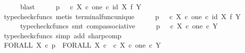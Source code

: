\begin{isabellebody}
\ \ \ \ \isamarkupfalse%
\ blast\isanewline
\ \ \isamarkupfalse%
\ \isamarkupfalse%
\ {\isachardoublequoteopen}p\isactrlsup {\isasymsharp}\ {\isacharequal}{\kern0pt}\ {\isacharparenleft}{\kern0pt}{\isasymt}\ {\isasymcirc}\isactrlsub c\ {\isasymbeta}\isactrlbsub X\ {\isasymtimes}\isactrlsub c\ one\isactrlesub \ {\isasymcirc}\isactrlsub c\ {\isacharparenleft}{\kern0pt}id\ X\ {\isasymtimes}\isactrlsub f\ {\isasymbeta}\isactrlbsub Y\isactrlesub {\isacharparenright}{\kern0pt}{\isacharparenright}{\kern0pt}\isactrlsup {\isasymsharp}{\isachardoublequoteclose}\isanewline
\ \ \ \ \isamarkupfalse%
\ {\isacharparenleft}{\kern0pt}typecheck{\isacharunderscore}{\kern0pt}cfuncs{\isacharcomma}{\kern0pt}\ metis\ terminal{\isacharunderscore}{\kern0pt}func{\isacharunderscore}{\kern0pt}unique{\isacharparenright}{\kern0pt}\isanewline
\ \ \isamarkupfalse%
\ \isamarkupfalse%
\ {\isachardoublequoteopen}p\isactrlsup {\isasymsharp}\ {\isacharequal}{\kern0pt}\ {\isacharparenleft}{\kern0pt}{\isacharparenleft}{\kern0pt}{\isasymt}\ {\isasymcirc}\isactrlsub c\ {\isasymbeta}\isactrlbsub X\ {\isasymtimes}\isactrlsub c\ one\isactrlesub {\isacharparenright}{\kern0pt}\ {\isasymcirc}\isactrlsub c\ {\isacharparenleft}{\kern0pt}id\ X\ {\isasymtimes}\isactrlsub f\ {\isasymbeta}\isactrlbsub Y\isactrlesub {\isacharparenright}{\kern0pt}{\isacharparenright}{\kern0pt}\isactrlsup {\isasymsharp}{\isachardoublequoteclose}\isanewline
\ \ \ \ \isamarkupfalse%
\ {\isacharparenleft}{\kern0pt}typecheck{\isacharunderscore}{\kern0pt}cfuncs{\isacharcomma}{\kern0pt}\ smt\ comp{\isacharunderscore}{\kern0pt}associative{}{\isacharparenright}{\kern0pt}\isanewline
\ \ \isamarkupfalse%
\ \isamarkupfalse%
\ {\isachardoublequoteopen}p\isactrlsup {\isasymsharp}\ {\isacharequal}{\kern0pt}\ {\isacharparenleft}{\kern0pt}{\isasymt}\ {\isasymcirc}\isactrlsub c\ {\isasymbeta}\isactrlbsub X\ {\isasymtimes}\isactrlsub c\ one\isactrlesub {\isacharparenright}{\kern0pt}\isactrlsup {\isasymsharp}\ {\isasymcirc}\isactrlsub c\ {\isasymbeta}\isactrlbsub Y\isactrlesub {\isachardoublequoteclose}\isanewline
\ \ \ \ \isamarkupfalse%
\ {\isacharparenleft}{\kern0pt}typecheck{\isacharunderscore}{\kern0pt}cfuncs{\isacharcomma}{\kern0pt}\ simp\ add{\isacharcolon}{\kern0pt}\ sharp{\isacharunderscore}{\kern0pt}comp{\isacharparenright}{\kern0pt}\isanewline
\ \ \isamarkupfalse%
\ \isamarkupfalse%
\ {\isachardoublequoteopen}FORALL\ X\ {\isasymcirc}\isactrlsub c\ p\isactrlsup {\isasymsharp}\ {\isacharequal}{\kern0pt}\ {\isacharparenleft}{\kern0pt}FORALL\ X\ {\isasymcirc}\isactrlsub c\ {\isacharparenleft}{\kern0pt}{\isasymt}\ {\isasymcirc}\isactrlsub c\ {\isasymbeta}\isactrlbsub X\ {\isasymtimes}\isactrlsub c\ one\isactrlesub {\isacharparenright}{\kern0pt}\isactrlsup {\isasymsharp}{\isacharparenright}{\kern0pt}\ {\isasymcirc}\isactrlsub c\ {\isasymbeta}\isactrlbsub Y\isactrlesub {\isachardoublequoteclose}\isanewline

\end{isabellebody}
